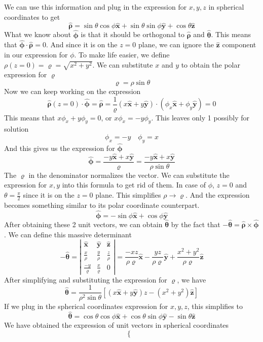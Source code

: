 \documentclass[12pt]{article}
\newcommand{\sqbkt}[1]{\left[ #1 \right]}
\newcommand{\paren}[1]{\left( #1 \right)}
\newcommand{\abso}[1]{\left|#1 \right|}
\newcommand{\unx}{\hat{\mathbf{x}}}
\newcommand{\uny}{\hat{\mathbf{y}}}
\newcommand{\unz}{\hat{\mathbf{z}}}
\newcommand{\untheta}{\hat{\boldsymbol\theta}}
\newcommand{\unphi}{\hat{\boldsymbol\phi}}
\newcommand{\unrho}{\hat{\boldsymbol\rho}}
\begin{document}
\begin{enumerate}
\[    \]
    We can use this information and plug in the expression for $x,y,z$ in spherical coordinates to get
    \[
    \unrho = \sin\theta\cos\phi \unx + \sin\theta\sin\phi\uny + \cos\theta \unz
    \]
    What we know about $\unphi$ is that it should be orthogonal to $\unrho$ and $\untheta$. This means that $\unphi \cdot \unrho = 0$. And since it is on the $z=0$ plane, we can ignore the $\unz$ component in our expression for $\phi$. To make life easier, we define $\rho(z=0) = \varrho = \sqrt{x^2 + y^2}$. We can substitute $x$ and $y$ to obtain the polar expression for $\varrho$
    \[
    \varrho = \rho\sin\theta
    \]
    Now we can keep working on the expression
    \[
    \unrho(z=0) \cdot \unphi = \unrho = \frac{1}{\varrho}\paren{x\unx + y\uny} \cdot \paren{\phi_x\unx + \phi_y\uny} = 0
    \]
    This means that $x\phi_x + y\phi_y = 0$, or $x\phi_x = -y\phi_y$. This leaves only 1 possibly for solution
    \[
    \phi_x = -y \quad \phi_y = x
    \]
    And this gives us the expression for $\unphi$
    \[
    \unphi = \frac{-y\unx + x\uny}{\varrho} = \frac{-y\unx + x\uny}{\rho\sin\theta} 
    \]
    The $\varrho$ in the denominator normalizes the vector. We can substitute the expression for $x,y$ into this formula to get rid of them. In case of $\phi$, $z=0$ and $\theta = \frac{\pi}{2}$ since it is on the $z=0$ plane. This simplifies $\rho \to \varrho$. And the expression becomes something similar to its polar coordinate counterpart. 
    \[
    \unphi = -\sin\phi\unx + \cos\phi \uny
    \]
    After obtaining these 2 unit vectors, we can obtain $\untheta$ by the fact that $-\untheta = \unrho \times \unphi$. We can define this massive determinant
    \[
    -\untheta = \abso{
    \begin{matrix}
        \unx & \uny & \unz \\
        \frac{x}{\rho}&\frac{y}{\rho}&\frac{z}{\rho}\\
        \frac{-y}{\varrho}&\frac{x}{\varrho}&0
    \end{matrix}
    } = \frac{-xz}{\rho\varrho}\unx - \frac{yz}{\rho\varrho}\uny + \frac{x^2+y^2}{\rho\varrho}\unz
    \]
    After simplifying and substituting the expression for $\varrho$, we have
    \[
    \untheta = \frac{1}{\rho^2\sin\theta}\sqbkt{\paren{x\unx + y\uny}z - \paren{x^2+y^2}\unz}
    \]
    If we plug in the spherical coordinates expression for $x,y,z$, this simplifies to
    \[
    \untheta = \cos\theta\cos\phi \unx + \cos\theta\sin\phi \uny - \sin\theta \unz
    \]
    We have obtained the expression of unit vectors in spherical coordinates
    \[
    \begin{cases}

\end{cases}\]
\end{enumerate}
\end{document}
